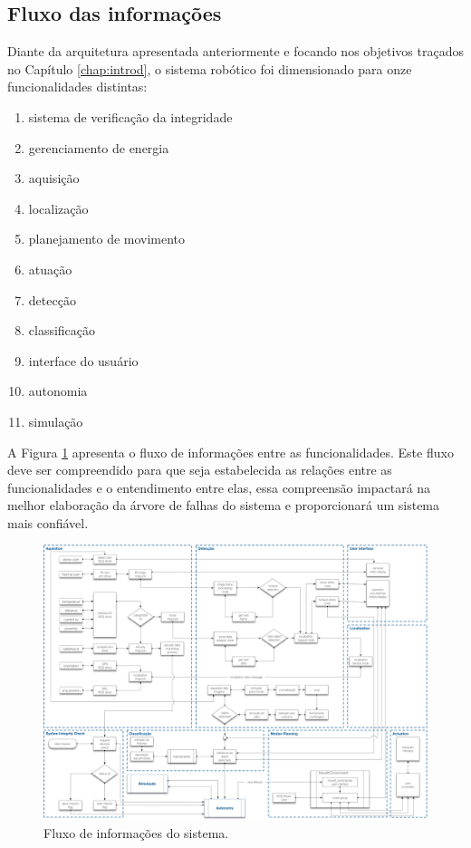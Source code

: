 \subsection{Fluxo das informações}
\label{ssec:fluxo}

Diante da arquitetura apresentada anteriormente e focando nos objetivos traçados no Capítulo \ref{chap:introd}, o sistema robótico foi dimensionado para onze funcionalidades distintas:

\begin{enumerate}%
	\item sistema de verificação da integridade
	\item gerenciamento de energia
	\item aquisição
	\item localização
	\item planejamento de movimento
	\item atuação
	\item detecção
	\item classificação
	\item interface do usuário
	\item autonomia
	\item simulação
\end{enumerate}

A Figura \ref{img:elirfluxo} apresenta o fluxo de informações entre as funcionalidades. Este fluxo deve ser compreendido para que seja estabelecida as relações entre as funcionalidades e o entendimento entre elas, essa compreensão impactará na melhor elaboração da árvore de falhas do sistema e proporcionará um sistema mais confiável.

\begin{figure} [h!]	
	\caption{Fluxo de informações do sistema.}
	\label{img:elirfluxo}											 
	\centering													 
	\includegraphics[width=1.0\textwidth]{Figures/flxinfofunctionalities}
\end{figure}													 

